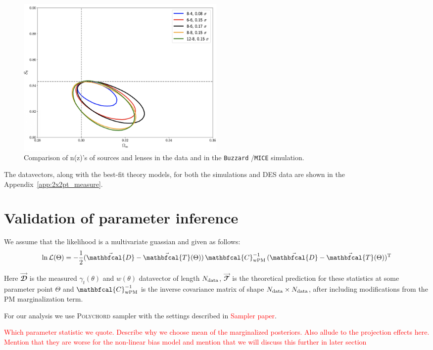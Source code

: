 \documentclass[fleqn,usenatbib]{mnras}
\newcommand{\gammat}{\ensuremath{\gamma_{t}(\theta)}}
\newcommand{\wtheta}{\ensuremath{w(\theta)}}
\newcommand{\mice}{\texttt{MICE} }
\newcommand{\buzzard}{\texttt{Buzzard} }
\newcommand{\red}[1]{\textcolor{red}{#1}}
\begin{document}
\begin{figure}
\includegraphics[width=0.5\textwidth,draft]{figs/temp.png}
\caption[]{Comparison of n(z)'s of sources and lenses in the data and in the \buzzard/\mice simulation. }
\label{fig:nz_comp}
\end{figure}

The datavectors, along with the best-fit theory models, for both the simulations and DES data are shown in the Appendix~\ref{app:2x2pt_measure}. 


\section{Validation of parameter inference}

We assume that the likelihood is a multivariate guassian and given as follows:
\begin{equation}
    \ln \mathcal{L}(\Theta) = -\frac{1}{2} (\vec{\mathbfcal{D}} - \vec{\mathbfcal{T}}(\Theta)) \, {\mathbfcal{C}}^{-1}_{\rm wPM} \,  (\vec{\mathbfcal{D}} - \vec{\mathbfcal{T}}(\Theta))^{\rm T}
\end{equation}

Here $\vec{\mathbfcal{D}}$ is the measured $\gammat$ and $\wtheta$ datavector of length $N_{\rm data}$, $\vec{\mathbfcal{T}}$ is the theoretical prediction for these statistics at some parameter point $\Theta$ and ${\mathbfcal{C}}^{-1}_{\rm wPM}$ is the inverse covariance matrix of shape $N_{\rm data} \times N_{\rm data}$, after including modifications from the PM marginalization term.

For our analysis we use \textsc{Polychord} sampler with the settings described in \red{Sampler paper}. 

\red{Which parameter statistic we quote. Describe why we choose mean of the marginalized posteriors. Also allude to the projection effects here. Mention that they are worse for the non-linear bias model and mention that we will discuss this further in later section }
\end{document}

